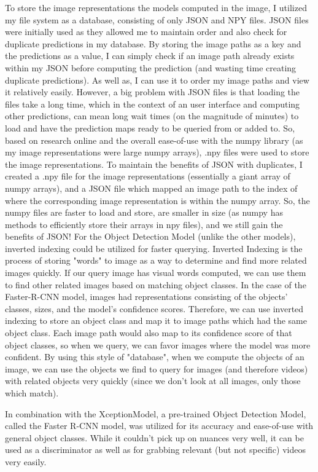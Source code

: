 \documentclass[10pt,twocolumn]{article}
\begin{document}
To store the image representations the models computed in the image, I utilized my file system as a database, consisting of only JSON and NPY files. JSON files were initially used as they allowed me to maintain order and also check for duplicate predictions in my database. By storing the image paths as a key and the predictions as a value, I can simply check if an image path already exists within my JSON before computing the prediction (and wasting time creating duplicate predictions). As well as, I can use it to order my image paths and view it relatively easily. However, a big problem with JSON files is that loading the files take a long time, which in the context of an user interface and computing other predictions, can mean long wait times (on the magnitude of minutes) to load and have the prediction maps ready to be queried from or added to. So, based on research online \cite{} and the overall ease-of-use with the numpy library (as my image representations were large numpy arrays), .npy files were used to store the image representations. To maintain the benefits of JSON with duplicates, I created a .npy file for the image representations (essentially a giant array of numpy arrays), and a JSON file which mapped an image path to the index of where the corresponding image representation is within the numpy array. So, the numpy files are faster to load and store, are smaller in size (as numpy has methods to efficiently store their arrays in npy files), and we still gain the benefits of JSON! For the Object Detection Model (unlike the other models), inverted indexing could be utilized for faster querying. Inverted Indexing is the process of storing "words" to image as a way to determine and find more related images quickly. If our query image has visual words computed, we can use them to find other related images based on matching object classes. In the case of the Faster-R-CNN model, images had representations consisting of the objects' classes, sizes, and the model's confidence scores. Therefore, we can use inverted indexing to store an object class and map it to image paths which had the same object class. Each image path would also map to its confidence score of that object classes, so when we query, we can favor images where the model was more confident. By using this style of "database", when we compute the objects of an image, we can use the objects we find to query for images (and therefore videos) with related objects very quickly (since we don't look at all images, only those which match).

In combination with the XceptionModel, a pre-trained Object Detection Model, called the Faster R-CNN model, was utilized for its accuracy and ease-of-use with general object classes. While it couldn't pick up on nuances very well, it can be used as a discriminator as well as for grabbing relevant (but not specific) videos very easily. 
\end{document}
